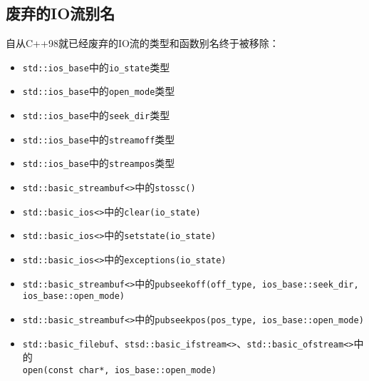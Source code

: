 \subsection{废弃的IO流别名}
自从C++98就已经废弃的IO流的类型和函数别名终于被移除：
\begin{itemize}
    \item \texttt{std::ios\_base}中的\texttt{io\_state}类型
    \item \texttt{std::ios\_base}中的\texttt{open\_mode}类型
    \item \texttt{std::ios\_base}中的\texttt{seek\_dir}类型
    \item \texttt{std::ios\_base}中的\texttt{streamoff}类型
    \item \texttt{std::ios\_base}中的\texttt{streampos}类型
    \item \texttt{std::basic\_streambuf<>}中的\texttt{stossc()}
    \item \texttt{std::basic\_ios<>}中的\texttt{clear(io\_state)}
    \item \texttt{std::basic\_ios<>}中的\texttt{setstate(io\_state)}
    \item \texttt{std::basic\_ios<>}中的\texttt{exceptions(io\_state)}
    \item \texttt{std::basic\_streambuf<>}中的\texttt{pubseekoff(off\_type, ios\_base::seek\_dir,\\
    ios\_base::open\_mode)}
    \item \texttt{std::basic\_streambuf<>}中的\texttt{pubseekpos(pos\_type, ios\_base::open\_mode)}
    \item \texttt{std::basic\_filebuf}、\texttt{stsd::basic\_ifstream<>}、\texttt{std::basic\_ofstream<>}中
    的\\
    \texttt{open(const char*, ios\_base::open\_mode)}
\end{itemize}

